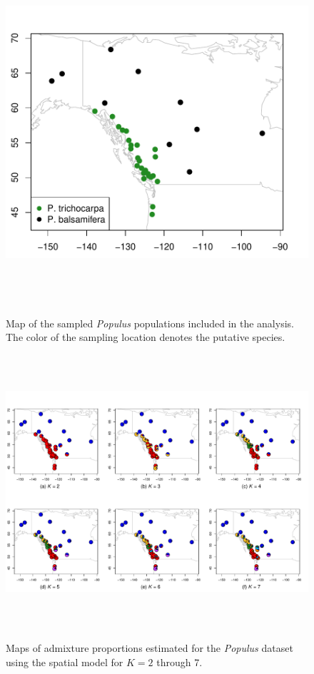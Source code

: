\documentclass[12pt]{article}
\begin{document}
\begin{figure}
	\centering
		{\includegraphics[width=6in,height=5in]{figs/populus/populus_sampling_map.pdf}}
	\caption{
	Map of the sampled \textit{Populus} populations included in the analysis.
	The color of the sampling location denotes the putative species.
    }\label{populus_map}
\end{figure}

\begin{figure}
	\centering
		{\includegraphics[width=6in,height=4in]{figs/populus/populus_sp_pies.pdf}}
	\caption{
	Maps of admixture proportions estimated for the \textit{Populus} dataset 
	using the spatial model for $K=2$ through 7.
    }\label{populus_sp_pies}
\end{figure}
\end{document}
